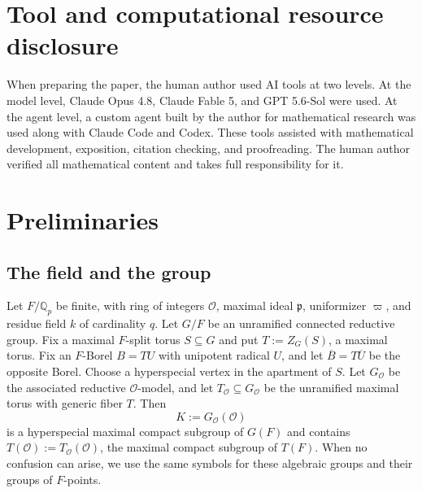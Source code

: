 \documentclass[12pt]{article}
\numberwithin{equation}{section}
\theoremstyle{definition}
\theoremstyle{remark}
\theoremstyle{plain}
\begin{document}
\section*{Tool and computational resource disclosure}

When preparing the paper, the human author used AI tools at two levels. At the model level, Claude Opus 4.8, Claude Fable 5, and GPT 5.6-Sol were used. At the agent level, a custom agent built by the author for mathematical research was used along with Claude Code and Codex. These tools assisted with mathematical development, exposition, citation checking, and proofreading. The human author verified all mathematical content and takes full responsibility for it.


\section{Preliminaries}\label{sec:notation}

\subsection{The field and the group}
Let $F/\mathbb{Q}_p$ be finite, with ring of integers $\mathcal{O}$, maximal ideal $\mathfrak{p}$, uniformizer $\varpi$, and residue field $k$ of cardinality $q$. Let $G/F$ be an unramified connected reductive group. Fix a maximal $F$-split torus $S \subseteq G$ and put $T := Z_G(S)$, a maximal torus. Fix an $F$-Borel $B = TU$ with unipotent radical $U$, and let $\overline{B} = T\overline{U}$ be the opposite Borel. Choose a hyperspecial vertex in the apartment of $S$. Let $G_{\mathcal O}$ be the associated reductive $\mathcal O$-model, and let $T_{\mathcal O}\subseteq G_{\mathcal O}$ be the unramified maximal torus with generic fiber $T$. Then
$$K := G_{\mathcal O}(\mathcal{O})$$
is a hyperspecial maximal compact subgroup of $G(F)$ and contains $T(\mathcal O):=T_{\mathcal O}(\mathcal O)$, the maximal compact subgroup of $T(F)$.
When no confusion can arise, we use the same symbols for these algebraic groups and their groups of $F$-points.
\end{document}
